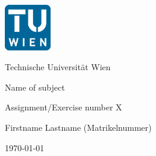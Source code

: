 \begin{titlepage}
\begin{center}


\includegraphics[width=20mm]{../images/tu_wien_logo.png__511x511_q85_subsampling-2.png} \\

\large

Technische Universität Wien

\vspace{6cm}

\Large{Name of subject}

\vspace{.5cm}

\huge{Assignment/Exercise number X}

\vspace{.5cm}

\Large{Firstname Lastname (Matrikelnummer)}

\vfill

\today

\end{center}
\end{titlepage}
